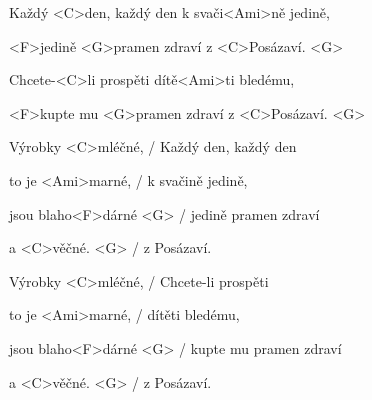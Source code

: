 

\zs
Každý <C>den, každý den k svači<Ami>ně jedině,

<F>jedině <G>pramen zdraví z <C>Posázaví. <G>

Chcete-<C>li prospěti dítě<Ami>ti bledému,

<F>kupte mu <G>pramen zdraví z <C>Posázaví. <G>
\ks

\zr
Výrobky <C>mléčné, / Každý den, každý den

to je <Ami>marné, / k svačině jedině,

jsou blaho<F>dárné <G> / jedině pramen zdraví

a <C>věčné. <G> / z Posázaví.

Výrobky <C>mléčné, / Chcete-li prospěti

to je <Ami>marné, / dítěti bledému,

jsou blaho<F>dárné <G> / kupte mu pramen zdraví

a <C>věčné. <G> / z Posázaví.

\kr

\zr \kr
\kp
